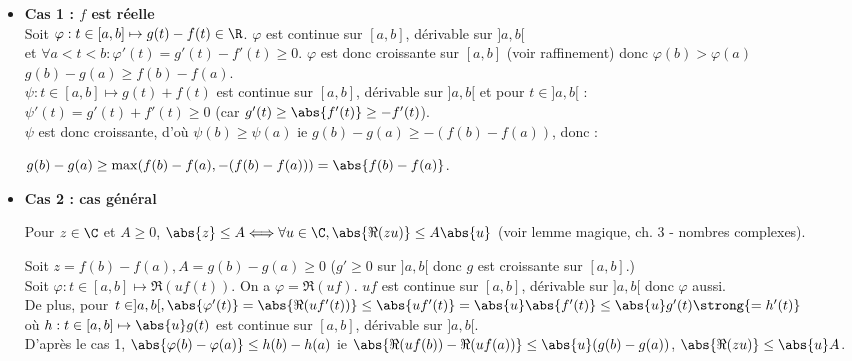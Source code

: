 \documentclass[12pt,a4paper]{report}
\begin{document}
\begin{demo}
\begin{itemize}
    \item \textbf{Cas 1 : $f$ est réelle} \\
    	Soit $\varphi : t \in [a,b] \mapsto g(t)-f(t) \in \R$. $\varphi$ est continue sur $[a,b]$, dérivable sur $]a,b[$ \\
	et $\forall a < t < b : \varphi'(t) = g'(t) - f'(t) \geq 0$. $\varphi$ est donc croissante sur $[a,b]$ (voir raffinement) donc $\varphi(b)>\varphi(a)$ \ie $g(b)-g(a) \geq f(b)-f(a)$. \\
	
	$\psi : t \in [a,b] \mapsto g(t)+f(t)$ est continue sur $[a,b]$, dérivable sur $]a,b[$ et pour $t \in ]a,b[$ : \\
	$\psi'(t) = g'(t) + f'(t) \geq 0$ (car $g'(t) \geq \abs{f'(t)}\geq -f'(t)$). \\
	$\psi$ est donc croissante, d'où $\psi(b) \geq \psi(a)$ ie $g(b)-g(a) \geq -(f(b)-f(a))$, donc :
	\begin{center}
	$g(b)-g(a) \geq \max(f(b)-f(a),-(f(b)-f(a))) = \abs{f(b)-f(a)}$.
	\end{center}
    \item \textbf{Cas 2 : cas général} \\
    \begin{remarque}[Rappel] Pour $z \in \C$ et $A \geq 0$, $\abs{z} \leq A \Longleftrightarrow \forall u \in \C, \abs{\Re(zu)} \leq A \abs{u}$ (voir lemme magique, ch. 3 - nombres complexes). \\
    \end{remarque}
  	Soit $z = f(b)-f(a), A = g(b)-g(a) \geq 0$ ($g' \geq 0$ sur $]a,b[$ donc $g$ est croissante sur $[a,b]$.) \\
	Soit $\varphi : t \in [a,b] \mapsto \Re(uf(t))$. On a $\varphi = \Re(uf)$. $uf$ est continue sur $[a,b]$, dérivable sur $]a,b[$ donc $\varphi$ aussi. \\
	De plus, pour $t \in ]a,b[, \abs{\varphi'(t)} = \abs{\Re(uf'(t))} \leq \abs{uf'(t)} = \abs{u} \abs{f'(t)} \leq \abs{u} g'(t) \strong{=h'(t)}$ \\
	où $h : t \in [a,b] \mapsto \abs{u}g(t)$ est continue sur $[a,b]$, dérivable sur $]a,b[$. \\
	D'après le cas 1, $\abs{\varphi(b)-\varphi(a)} \leq h(b)-h(a)$ ie $\abs{\Re(uf(b))-\Re(uf(a))} \leq \abs{u}(g(b)-g(a))$, \ie $\abs{\Re(zu)} \leq \abs{u}A$.
    
\end{itemize}
\end{demo}
\end{document}

